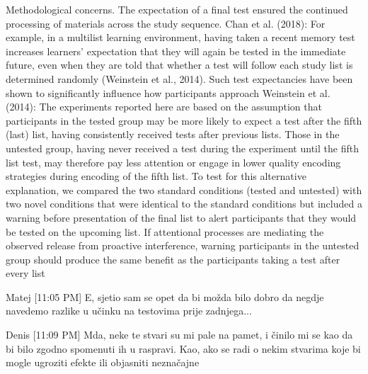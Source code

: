 \documentclass[../main.tex]{subfiles}
\begin{document}
Methodological concerns. The expectation of a final test ensured the
continued processing of materials across the study sequence.
Chan et al. (2018): %
For example, in a multilist learning environment, having taken a
recent memory test increases learners’ expectation that they will
again be tested in the immediate future, even when they are told
that whether a test will follow each study list is determined
randomly (Weinstein et al., 2014). Such test expectancies have
been shown to significantly influence how participants approach
Weinstein et al. (2014):
The experiments reported here are based on the assumption that
participants in the tested group may be more likely to expect a test
after the fifth (last) list, having consistently received tests after
previous lists. Those in the untested group, having never received
a test during the experiment until the fifth list test, may therefore
pay less attention or engage in lower quality encoding strategies
during encoding of the fifth list. To test for this alternative explanation, 
we compared the two standard conditions (tested and
untested) with two novel conditions that were identical to the
standard conditions but included a warning before presentation of
the final list to alert participants that they would be tested on the
upcoming list. If attentional processes are mediating the observed
release from proactive interference, warning participants in the
untested group should produce the same benefit as the participants
taking a test after every list


Matej [11:05 PM]
E, sjetio sam se opet da bi možda bilo dobro da negdje navedemo razlike u učinku na testovima prije zadnjega...

Denis [11:09 PM]
Mda, neke te stvari su mi pale na pamet, i činilo mi se kao da bi bilo zgodno spomenuti ih u raspravi. Kao, ako se radi o nekim stvarima koje bi mogle ugroziti efekte ili objasniti neznačajne
\end{document}
